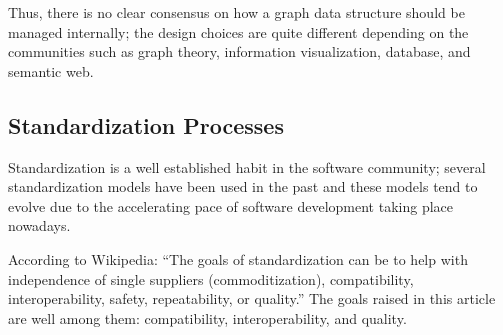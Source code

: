 Thus, there is no clear consensus on how a graph data structure should
be managed internally; the design choices are quite different
depending on the communities such as graph theory, information
visualization, database, and semantic web.


\subsection{Standardization Processes}

Standardization is a well established habit in the software community;
several standardization models have been used in the past and these
models tend to evolve due to the accelerating pace of software
development taking place nowadays.

According to Wikipedia: ``The goals of standardization can be to help
with independence of single suppliers (commoditization),
compatibility, interoperability, safety, repeatability, or quality.''
The goals raised in this article are well among them: compatibility,
interoperability, and quality.

